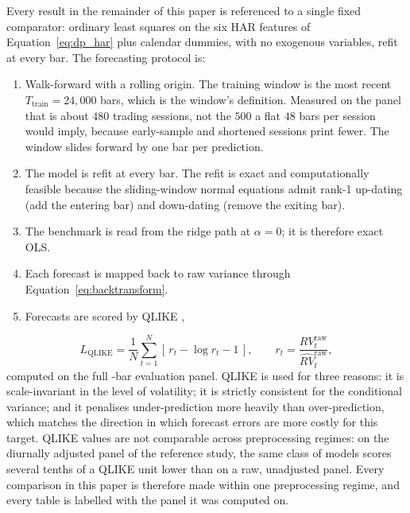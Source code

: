 Every result in the remainder of this paper is referenced to a single
fixed comparator: ordinary least squares on the six HAR features of
Equation~\eqref{eq:dp_har} plus calendar dummies, with no exogenous
variables, refit at every bar. The forecasting protocol is:
\begin{enumerate}
    \item Walk-forward with a rolling origin. The training window is the
      most recent $T_{\mathrm{train}} = 24{,}000$ bars, which is the
      window's definition. Measured on the panel that is about $480$
      trading sessions, not the $500$ a flat $48$ bars per session would
      imply, because early-sample and shortened sessions print fewer. The
      window slides forward by one bar per prediction.
    \item The model is refit at every bar. The refit is exact and
      computationally feasible because the sliding-window normal
      equations admit rank-1 up-dating (add the entering bar) and
      down-dating (remove the exiting bar).
    \item The benchmark is read from the ridge path at $\alpha = 0$; it is
      therefore exact OLS.
    \item Each forecast is mapped back to raw variance through
      Equation~\eqref{eq:backtransform}.
    \item Forecasts are scored by QLIKE \citep{Patton2011},
\end{enumerate}
\begin{equation}
    L_{\mathrm{QLIKE}}
    = \frac{1}{N}\sum_{t=1}^{N}\left[\, r_t - \log r_t - 1 \,\right],
    \qquad
    r_t = \frac{RV^{\mathrm{raw}}_t}{\widehat{RV}^{\mathrm{raw}}_t},
    \label{eq:dp_qlike}
\end{equation}
computed on the full \unifAzeroN{}-bar evaluation panel. QLIKE is used for
three reasons: it is scale-invariant in the level of volatility; it is
strictly consistent for the conditional variance; and it penalises
under-prediction more heavily than over-prediction, which matches the
direction in which forecast errors are more costly for this target. QLIKE
values are not comparable across preprocessing regimes: on the diurnally
adjusted panel of the reference study, the same class of models scores
several tenths of a QLIKE unit lower than on a raw, unadjusted panel.
Every comparison in this paper is therefore made within one preprocessing
regime, and every table is labelled with the panel it was computed on.

